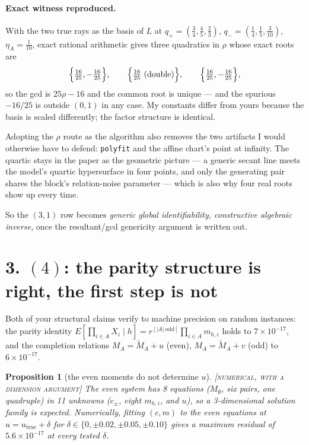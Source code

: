 \documentclass[11pt]{article}
\newtheorem{proposition}{Proposition}
\theoremstyle{remark}
\newcommand{\status}[1]{\hfill{\normalfont\small\textsc{[#1]}}}
\begin{document}
\paragraph{Exact witness reproduced.} With the two true rays as the basis of $L$ at $q_+=(\frac34,\frac45,\frac23)$, $q_-=(\frac14,\frac15,\frac3{10})$, $\eta_A=\frac1{10}$, exact rational arithmetic gives three quadratics in $\rho$ whose exact roots are
\[
\Bigl\{\tfrac{16}{25},-\tfrac{16}{25}\Bigr\},\qquad
\Bigl\{\tfrac{16}{25}\ \text{(double)}\Bigr\},\qquad
\Bigl\{\tfrac{16}{25},-\tfrac{16}{25}\Bigr\},
\]
so the gcd is $25\rho-16$ and the common root is unique --- and the spurious $-16/25$ is outside $(0,1)$ in any case. My constants differ from yours because the basis is scaled differently; the factor structure is identical.

Adopting the $\rho$ route as the algorithm also removes the two artifacts I would otherwise have to defend: \texttt{polyfit} and the affine chart's point at infinity. The quartic stays in the paper as the geometric picture --- a generic secant line meets the model's quartic hypersurface in four points, and only the generating pair shares the block's relation-noise parameter --- which is also why four real roots show up every time.

So the $(3,1)$ row becomes \emph{generic global identifiability, constructive algebraic inverse}, once the resultant/gcd genericity argument is written out.

\section*{3. $(4)$: the parity structure is right, the first step is not}

Both of your structural claims verify to machine precision on random instances: the parity identity $E[\prod_{i\in A}X_i\mid h]=r^{[|A|\ \mathrm{odd}]}\prod_{i\in A}m_{h,i}$ holds to $7\times10^{-17}$, and the completion relations $M_A=\widetilde M_A+u$ (even), $M_A=\widetilde M_A+v$ (odd) to $6\times10^{-17}$.

\begin{proposition}[the even moments do not determine $u$]\status{numerical, with a dimension argument}
The even system has 8 equations ($M_\emptyset$, six pairs, one quadruple) in 11 unknowns ($c_\pm$, eight $m_{h,i}$, and $u$), so a 3-dimensional solution family is expected. Numerically, fitting $(c,m)$ to the even equations at $u=u_{\text{true}}+\delta$ for $\delta\in\{0,\pm0.02,\pm0.05,\pm0.10\}$ gives a maximum residual of $5.6\times10^{-17}$ at \emph{every} tested $\delta$.
\end{proposition}
\end{document}
